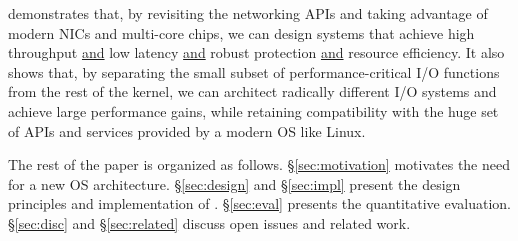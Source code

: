 \ix demonstrates that, by revisiting the networking APIs and taking
advantage of modern NICs and multi-core chips, we can design systems
that achieve high throughput \underline{and} low latency
\underline{and} robust protection \underline{and} resource
efficiency. It also shows that, by separating the small subset of
performance-critical I/O functions from the rest of the kernel, we can
architect radically different I/O systems and achieve large
performance gains, while retaining compatibility with the huge set of
APIs and services provided by a modern OS like Linux.

The rest of the paper is organized as follows. \S\ref{sec:motivation}
motivates the need for a new OS architecture. \S\ref{sec:design} and
\S\ref{sec:impl} present the design principles and implementation of
\ix.  \S\ref{sec:eval} presents the quantitative
evaluation. \S\ref{sec:disc} and \S\ref{sec:related} discuss open
issues and related work.



